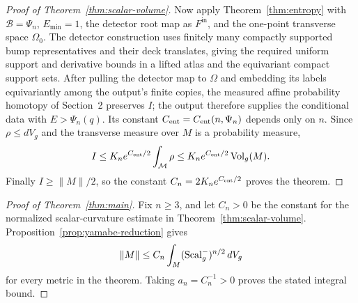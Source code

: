 \begin{proof}[Proof of Theorem~\ref{thm:scalar-volume}]
Now apply Theorem~\ref{thm:entropy} with \(\mathcal B=\Psi_n\),
\(E_{\min}=1\), the detector root map as \(F^{\mathrm{in}}\), and the
one-point transverse space \(\Omega_0\).  The detector construction uses
finitely many compactly supported bump representatives and their deck
translates, giving the required uniform support and derivative bounds in
a lifted atlas and the equivariant compact support sets.  After pulling
the detector map to \(\Omega\) and embedding its labels equivariantly
among the output's finite copies, the measured affine probability homotopy
of Section~2 preserves \(I\); the output therefore supplies the conditional
data with \(E>\Psi_n(q)\).  Its constant
\(C_{\rm ent}=C_{\rm ent}(n,\Psi_n)\) depends only on \(n\).  Since
\(\rho\leq dV_g\) and the transverse measure over \(M\) is a
probability measure,
\[
           I\leq K_ne^{C_{\rm ent}/2}\int_{\mathcal M}\rho
             \leq K_ne^{C_{\rm ent}/2}\operatorname{Vol}_g(M).
\]
Finally \(I\geq\|M\|/2\), so the constant
\(C_n=2K_ne^{C_{\rm ent}/2}\) proves the theorem.
\end{proof}

\begin{proof}[Proof of Theorem~\ref{thm:main}]
Fix \(n\geq3\), and let \(C_n>0\) be the constant for the normalized
scalar-curvature estimate in Theorem~\ref{thm:scalar-volume}.
Proposition~\ref{prop:yamabe-reduction} gives
\[
              \|M\|\leq C_n\int_M(\operatorname{Scal}_g^-)^{n/2}\,dV_g
\]
for every metric in the theorem.  Taking \(a_n=C_n^{-1}>0\) proves
the stated integral bound.
\end{proof}
